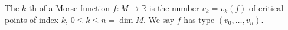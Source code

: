The $k$-th  of a Morse function $f: M \rightarrow \mathbb{R}$ is the number $v_k = v_k(f)$ of critical points of index $k$, $0 \leq k \leq n = \dim M$. We say $f$ has type $(v_0, \ldots, v_n)$.

